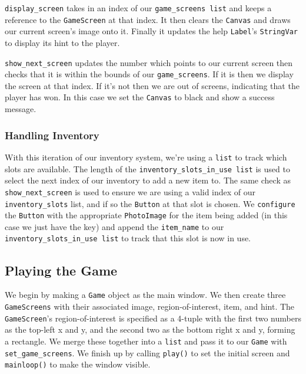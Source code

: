 \documentclass[a4paper,11pt,openany]{book}
\begin{document}
\vspace{5mm}

\lstinline[columns=fixed]{display_screen} takes in an index of our \lstinline[columns=fixed]{game_screens list} and keeps a reference to the \lstinline[columns=fixed]{GameScreen} at that index. It then clears the \lstinline[columns=fixed]{Canvas} and draws our current screen's image onto it. Finally it updates the help \lstinline[columns=fixed]{Label}'s \lstinline[columns=fixed]{StringVar} to display its hint to the player.

\vspace{5mm}

\lstinline[columns=fixed]{show_next_screen} updates the number which points to our current screen then checks that it is within the bounds of our \lstinline[columns=fixed]{game_screens}. If it is then we display the screen at that index. If it's not then we are out of screens, indicating that the player has won. In this case we set the \lstinline[columns=fixed]{Canvas} to black and show a success message. 

\subsubsection{Handling Inventory}

With this iteration of our inventory system, we're using a \lstinline[columns=fixed]{list} to track which slots are available. The length of the \lstinline[columns=fixed]{inventory_slots_in_use list} is used to select the next index of our inventory to add a new item to. The same check as \lstinline[columns=fixed]{show_next_screen} is used to ensure we are using a valid index of our \lstinline[columns=fixed]{inventory_slots} list, and if so the \lstinline[columns=fixed]{Button} at that slot is chosen. We \lstinline[columns=fixed]{configure} the \lstinline[columns=fixed]{Button} with the appropriate \lstinline[columns=fixed]{PhotoImage} for the item being added (in this case we just have the key) and append the \lstinline[columns=fixed]{item_name} to our \lstinline[columns=fixed]{inventory_slots_in_use list} to track that this slot is now in use. 

\subsection{Playing the Game}

We begin by making a \lstinline[columns=fixed]{Game} object as the main window. We then create three \lstinline[columns=fixed]{GameScreens} with their associated image, region-of-interest, item, and hint. The \lstinline[columns=fixed]{GameScreen}'s region-of-interest is specified as a 4-tuple with the first two numbers as the top-left x and y, and the second two as the bottom right x and y, forming a rectangle. We merge these together into a \lstinline[columns=fixed]{list} and pass it to our \lstinline[columns=fixed]{Game} with \lstinline[columns=fixed]{set_game_screens}. We finish up by calling \lstinline[columns=fixed]{play()} to set the initial screen and \lstinline[columns=fixed]{mainloop()} to make the window visible.
\end{document}
